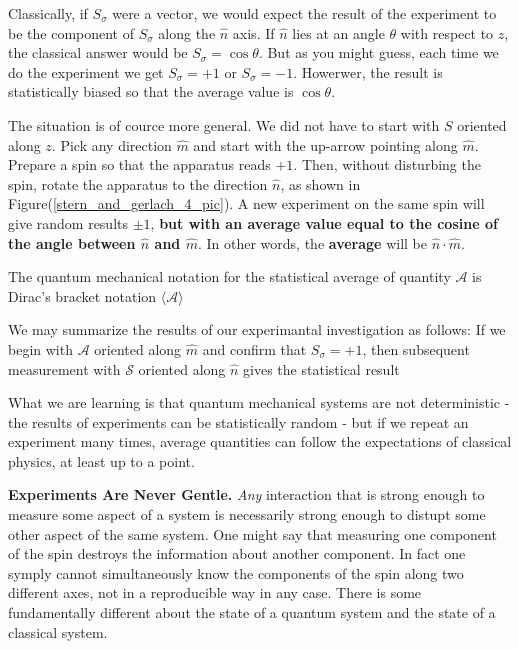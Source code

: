 \documentclass{article}
\begin{document}
Classically, if $S_{\sigma}$ were a vector, we would expect the result of the experiment to be the component of $S_{\sigma}$ along the $\hat{n}$ axis. If $\hat{n}$ lies at an angle $\theta$ with respect to $z$, the classical answer would be $S_{\sigma} = \cos \theta$. But as you might guess, each time we do the experiment we get $S_{\sigma} = + 1$ or $S_{\sigma} = - 1$. Howerwer, the result is statistically biased so that the average value is $\cos \theta$.

The situation is of cource more general. We did not have to start with $\textit{S}$ oriented along $z$. Pick any direction $\hat{m}$ and start with the up-arrow pointing along $\hat{m}$. Prepare a spin so that the apparatus reads $+1$. Then, without disturbing the spin, rotate the apparatus to the direction $\hat{n}$, as shown in Figure(\ref{stern_and_gerlach_4_pic}). A new experiment on the same spin will give random results $\pm 1$, \textbf{but with an average value equal to the cosine of the angle between $\hat{n}$ and $\hat{m}$}. In other words, the \textbf{average} will be 
$\hat{n} \cdot \hat{m}$.


The quantum mechanical notation for the statistical average of quantity $\mathcal{A}$ is Dirac's bracket notation
$\langle \mathcal{A} \rangle$

We may summarize the results of our experimantal investigation as follows: If we begin with $\mathcal{A}$ oriented along $\hat{m}$ and confirm that $S_{\sigma} = +1$, then subsequent measurement with $\mathcal{S}$ oriented along $\hat{n}$ gives the statistical result



What we are learning is that quantum mechanical systems are not deterministic - the results of experiments can be statistically random - but if we repeat an experiment many times, average quantities can follow the expectations of classical physics, at least up to a point.


\textbf{Experiments Are Never Gentle.} \textit{Any} interaction that is strong enough to measure some aspect of a system is necessarily strong enough to distupt some other aspect of the same system. One might say that measuring one component of the spin destroys the information about another component. In fact one symply cannot simultaneously know the components of the spin along two different axes, not in a reproducible way in any case. There is some fundamentally different about the state of a quantum system and the state of a classical system.
\end{document}
